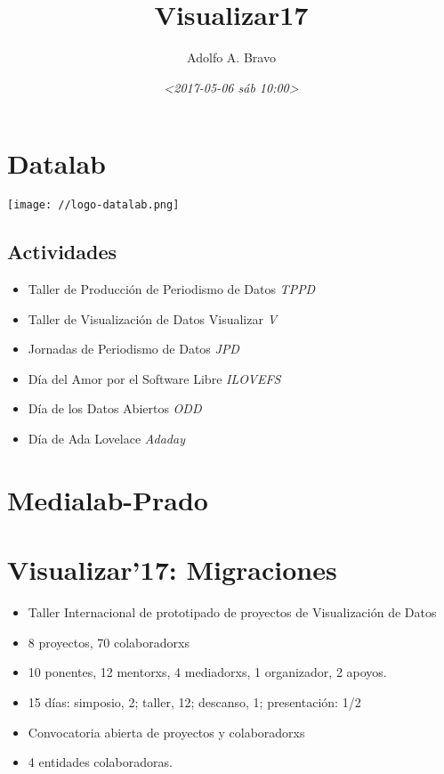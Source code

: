 \documentclass[11pt]{article}
\author{Adolfo A. Bravo}
\date{\textit{<2017-05-06 sáb 10:00>}}
\title{Visualizar17}
\begin{document}
\maketitle

\section*{Datalab}
\label{sec:orgf054e91}
\begin{center}
\texttt{[image: //logo-datalab.png]}
\end{center} 

\subsection*{Actividades}
\label{sec:org69bf19b}
\begin{itemize}
\item Taller de Producción de Periodismo de Datos \emph{TPPD}
\item Taller de Visualización de Datos Visualizar \emph{V}
\item Jornadas de Periodismo de Datos \emph{JPD}
\item Día del Amor por el Software Libre \emph{ILOVEFS}
\item Día de los Datos Abiertos \emph{ODD}
\item Día de Ada Lovelace \emph{Adaday}
\end{itemize}

\section*{Medialab-Prado}
\label{sec:org2688fce}

\section*{Visualizar'17: Migraciones}
\label{sec:org74ad055}

\begin{itemize}
\item Taller Internacional de prototipado de proyectos de Visualización de Datos
\item 8 proyectos, 70 colaboradorxs
\item 10 ponentes, 12 mentorxs, 4 mediadorxs, 1 organizador, 2 apoyos.
\item 15 días: simposio, 2; taller, 12; descanso, 1; presentación: 1/2
\item Convocatoria abierta de proyectos y colaboradorxs
\item 4 entidades colaboradoras.
\end{itemize}
\end{document}

